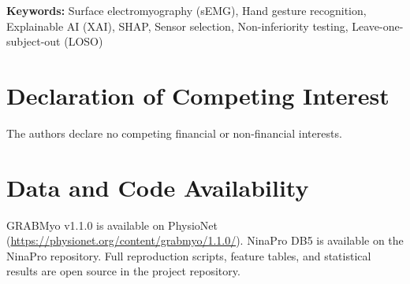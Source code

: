 \documentclass[11pt,a4paper]{article}
\begin{document}
\vspace{1em}
\noindent\textbf{Keywords:} Surface electromyography (sEMG), Hand gesture recognition, Explainable AI (XAI), SHAP, Sensor selection, Non-inferiority testing, Leave-one-subject-out (LOSO)








\section*{Declaration of Competing Interest}
The authors declare no competing financial or non-financial interests.

\section*{Data and Code Availability}
GRABMyo v1.1.0 is available on PhysioNet (\url{https://physionet.org/content/grabmyo/1.1.0/}). NinaPro DB5 is available on the NinaPro repository. Full reproduction scripts, feature tables, and statistical results are open source in the project repository.



\end{document}
